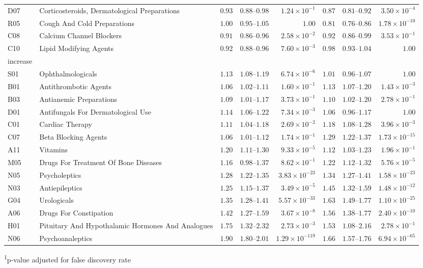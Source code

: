 \begin{longtable}{llrrrrrr}
D07 & Corticosteroids, Dermatological Preparations & $0.93$ & $0.88$–$0.98$ & $1.24 \times 10^{-1}$ & $0.87$ & $0.81$–$0.92$ & $3.50 \times 10^{-4}$ \\ 
R05 & Cough And Cold Preparations & $1.00$ & $0.95$–$1.05$ & $1.00$ & $0.81$ & $0.76$–$0.86$ & $1.78 \times 10^{-10}$ \\ 
C08 & Calcium Channel Blockers & $0.91$ & $0.86$–$0.96$ & $2.58 \times 10^{-2}$ & $0.92$ & $0.86$–$0.99$ & $3.53 \times 10^{-1}$ \\ 
C10 & Lipid Modifying Agents & $0.92$ & $0.88$–$0.96$ & $7.60 \times 10^{-3}$ & $0.98$ & $0.93$–$1.04$ & $1.00$ \\ 
\midrule
\multicolumn{1}{l}{increase} \\ 
\midrule
S01 & Ophthalmologicals & $1.13$ & $1.08$–$1.19$ & $6.74 \times 10^{-6}$ & $1.01$ & $0.96$–$1.07$ & $1.00$ \\ 
B01 & Antithrombotic Agents & $1.06$ & $1.02$–$1.11$ & $1.60 \times 10^{-1}$ & $1.13$ & $1.07$–$1.20$ & $1.43 \times 10^{-3}$ \\ 
B03 & Antianemic Preparations & $1.09$ & $1.01$–$1.17$ & $3.73 \times 10^{-1}$ & $1.10$ & $1.02$–$1.20$ & $2.78 \times 10^{-1}$ \\ 
D01 & Antifungals For Dermatological Use & $1.14$ & $1.06$–$1.22$ & $7.34 \times 10^{-3}$ & $1.06$ & $0.96$–$1.17$ & $1.00$ \\ 
C01 & Cardiac Therapy & $1.11$ & $1.04$–$1.18$ & $2.69 \times 10^{-2}$ & $1.18$ & $1.08$–$1.28$ & $3.96 \times 10^{-3}$ \\ 
C07 & Beta Blocking Agents & $1.06$ & $1.01$–$1.12$ & $1.74 \times 10^{-1}$ & $1.29$ & $1.22$–$1.37$ & $1.73 \times 10^{-15}$ \\ 
A11 & Vitamins & $1.20$ & $1.11$–$1.30$ & $9.33 \times 10^{-5}$ & $1.12$ & $1.03$–$1.23$ & $1.96 \times 10^{-1}$ \\ 
M05 & Drugs For Treatment Of Bone Diseases & $1.16$ & $0.98$–$1.37$ & $8.62 \times 10^{-1}$ & $1.22$ & $1.12$–$1.32$ & $5.76 \times 10^{-5}$ \\ 
N05 & Psycholeptics & $1.28$ & $1.22$–$1.35$ & $3.83 \times 10^{-23}$ & $1.34$ & $1.27$–$1.41$ & $1.58 \times 10^{-23}$ \\ 
N03 & Antiepileptics & $1.25$ & $1.15$–$1.37$ & $3.49 \times 10^{-5}$ & $1.45$ & $1.32$–$1.59$ & $1.48 \times 10^{-12}$ \\ 
G04 & Urologicals & $1.35$ & $1.28$–$1.41$ & $5.57 \times 10^{-33}$ & $1.63$ & $1.49$–$1.77$ & $1.10 \times 10^{-25}$ \\ 
A06 & Drugs For Constipation & $1.42$ & $1.27$–$1.59$ & $3.67 \times 10^{-8}$ & $1.56$ & $1.38$–$1.77$ & $2.40 \times 10^{-10}$ \\ 
H01 & Pituitary And Hypothalamic Hormones And Analogues & $1.75$ & $1.32$–$2.32$ & $2.73 \times 10^{-3}$ & $1.53$ & $1.08$–$2.16$ & $2.78 \times 10^{-1}$ \\ 
N06 & Psychoanaleptics & $1.90$ & $1.80$–$2.01$ & $1.29 \times 10^{-119}$ & $1.66$ & $1.57$–$1.76$ & $6.94 \times 10^{-65}$ \\ 
\bottomrule
\end{longtable}
\begin{minipage}{\linewidth}
\textsuperscript{1}p-value adjusted for false discovery rate\\
\end{minipage}

